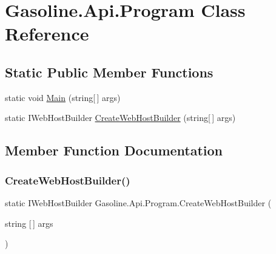 \hypertarget{class_gasoline_1_1_api_1_1_program}{}\section{Gasoline.\+Api.\+Program Class Reference}
\label{class_gasoline_1_1_api_1_1_program}
\subsection*{Static Public Member Functions}
\begin{DoxyCompactItemize}
\item 
static void \mbox{\hyperlink{class_gasoline_1_1_api_1_1_program_a685a9d76de8a9e32164d0c7ebfdf6f7d}{Main}} (string\mbox{[}$\,$\mbox{]} args)
\item 
static I\+Web\+Host\+Builder \mbox{\hyperlink{class_gasoline_1_1_api_1_1_program_a73b4e45c314919dd5cb0b7c989681466}{Create\+Web\+Host\+Builder}} (string\mbox{[}$\,$\mbox{]} args)
\end{DoxyCompactItemize}


\subsection{Member Function Documentation}
\mbox{\label{class_gasoline_1_1_api_1_1_program_a73b4e45c314919dd5cb0b7c989681466}} 
\subsubsection{\texorpdfstring{CreateWebHostBuilder()}{CreateWebHostBuilder()}}
{\footnotesize\ttfamily static I\+Web\+Host\+Builder Gasoline.\+Api.\+Program.\+Create\+Web\+Host\+Builder (\begin{DoxyParamCaption}\item[{string \mbox{[}$\,$\mbox{]}}]{args }\end{DoxyParamCaption})\hspace{0.3cm}{\ttfamily [static]}}

\mbox{\label{class_gasoline_1_1_api_1_1_program_a685a9d76de8a9e32164d0c7ebfdf6f7d}} 
